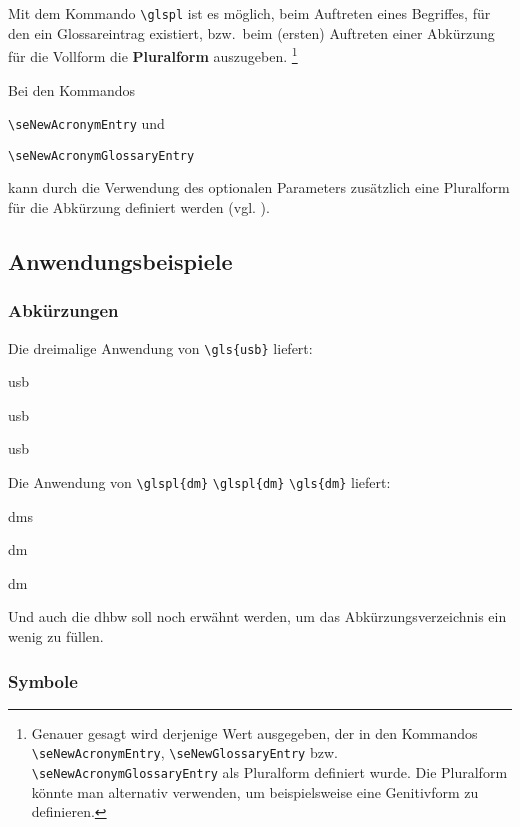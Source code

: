 Mit dem Kommando \verb+\glspl+ ist es m\"oglich, beim
Auftreten eines Begriffes,  f\"ur den ein Glossareintrag existiert, bzw.\ beim (ersten) Auftreten einer 
Abk\"urzung f\"ur die Vollform die  \textbf{Pluralform} auszugeben.%
\footnote{Genauer gesagt wird derjenige Wert ausgegeben, der in den 
Kommandos \texttt{\textbackslash{}seNewAcronymEntry}, \texttt{\textbackslash{}seNewGlossaryEntry} bzw. \texttt{\textbackslash{}seNewAcronymGlossaryEntry}
als Pluralform definiert wurde. Die Pluralform k\"onnte man alternativ verwenden, um beispielsweise eine 
Genitivform zu definieren.}

Bei den Kommandos 
\begin{seList}
\item\verb+\seNewAcronymEntry+ und 
\item\verb+\seNewAcronymGlossaryEntry+
\end{seList}
kann durch die Verwendung des optionalen Parameters 
zu\-s\"atz\-lich eine Pluralform f\"ur die Abk\"urzung definiert werden (vgl. \dateiAbk{}).

\subsection{Anwendungsbeispiele}

\subsubsection{Abk\"urzungen}

Die dreimalige Anwendung von \verb+\gls{usb}+ liefert:

\begin{seList}
\item \gls{usb}
\item \gls{usb}
\item \gls{usb}
\end{seList}

Die Anwendung von \verb+\glspl{dm}+ \verb+\glspl{dm}+ \verb+\gls{dm}+ liefert:

\begin{seList}
\item \glspl{dm}
\item \gls{dm}
\item \gls{dm}
\end{seList}

Und auch die \gls{dhbw} soll noch erw\"ahnt werden, um das Abk\"urzungsverzeichnis ein wenig zu f\"ullen.

\subsubsection{Symbole}

